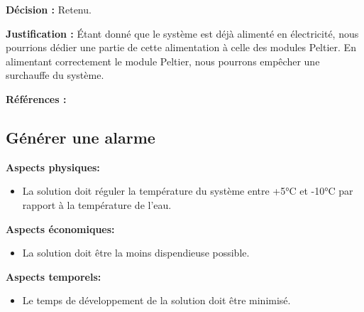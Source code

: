\textbf{Décision :} Retenu.

\textbf{Justification :} Étant donné que le système est déjà alimenté en électricité, nous pourrions dédier une partie de cette alimentation à celle des modules Peltier. En alimentant correctement le module Peltier, nous pourrons empêcher une surchauffe du système.

\textbf{Références :} \cite{pel1} \cite{pel2}

\begin{table}[!htb]
\footnotesize
\centering
{}
\caption{Faisabilité des concepts pour réguler la température}
\label{t:Decision_réguler}
\end{table}


\subsection{Générer une alarme}



\textbf{Aspects physiques:}
\begin{itemize}[label = {--}]
    \item La solution doit réguler la température du système entre +5°C et -10°C par rapport à la température de l'eau.
\end{itemize}

\textbf{Aspects économiques:}
\begin{itemize}[label = {--}]
    \item La solution doit être la moins dispendieuse possible.
\end{itemize}

\textbf{Aspects temporels:}
\begin{itemize}[label = {--}]
    \item Le temps de développement de la solution doit être minimisé.
\end{itemize}

